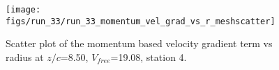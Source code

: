 \begin{figure}[H]
\centering
\texttt{[image: figs/run\_33/run\_33\_momentum\_vel\_grad\_vs\_r\_meshscatter]}
\caption{Scatter plot of the momentum based velocity gradient term vs radius at $z/c$=8.50, $V_{free}$=19.08, station 4.}
\label{fig:run_33_momentum_vel_grad_vs_r_meshscatter}
\end{figure}


